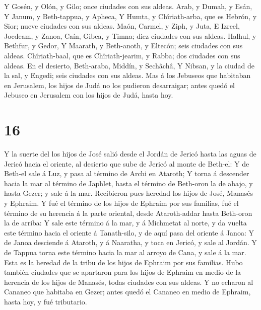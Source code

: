  Y Gosén, y Olón, y Gilo; once ciudades con sus aldeas.
 Arab, y Dumah, y Esán,  Y Janum, y
Beth-tappua, y Apheca,  Y Humta, y Chîriath-arba, que es
Hebrón, y Sior; nueve ciudades con sus aldeas.  Maón,
Carmel, y Ziph, y Juta,  E Izreel, Jocdeam, y Zanoa,
 Caín, Gibea, y Timna; diez ciudades con sus aldeas.
 Halhul, y Bethfur, y Gedor,  Y Maarath, y
Beth-anoth, y Eltecón; seis ciudades con sus aldeas. 
Chîriath-baal, que es Chîriath-jearim, y Rabba; dos ciudades con sus
aldeas.  En el desierto, Beth-araba, Middín, y Sechâchâ,
 Y Nibsan, y la ciudad de la sal, y Engedi; seis ciudades
con sus aldeas.  Mas á los Jebuseos que habitaban en
Jerusalem, los hijos de Judá no los pudieron desarraigar; antes quedó el
Jebuseo en Jerusalem con los hijos de Judá, hasta hoy.

\hypertarget{section-15}{%
\section{16}\label{section-15}}

 Y la suerte del los hijos de José salió desde el Jordán de
Jericó hasta las aguas de Jericó hacia el oriente, al desierto que sube
de Jericó al monte de Beth-el:  Y de Beth-el sale á Luz, y
pasa al término de Archi en Ataroth;  Y torna á descender
hacia la mar al término de Japhlet, hasta el término de Beth-oron la de
abajo, y hasta Gezer; y sale á la mar.  Recibieron pues
heredad los hijos de José, Manasés y Ephraim.  Y fué el
término de los hijos de Ephraim por sus familias, fué el término de su
herencia á la parte oriental, desde Ataroth-addar hasta Beth-oron la de
arriba:  Y sale este término á la mar, y á Michmetat al
norte, y da vuelta este término hacia el oriente á Tanath-silo, y de
aquí pasa del oriente á Janoa:  Y de Janoa desciende á
Ataroth, y á Naaratha, y toca en Jericó, y sale al Jordán. 
Y de Tappua torna este término hacia la mar al arroyo de Cana, y sale á
la mar. Esta es la heredad de la tribu de los hijos de Ephraim por sus
familias.  Hubo también ciudades que se apartaron para los
hijos de Ephraim en medio de la herencia de los hijos de Manasés, todas
ciudades con sus aldeas.  Y no echaron al Cananeo que
habitaba en Gezer; antes quedó el Cananeo en medio de Ephraim, hasta
hoy, y fué tributario.

